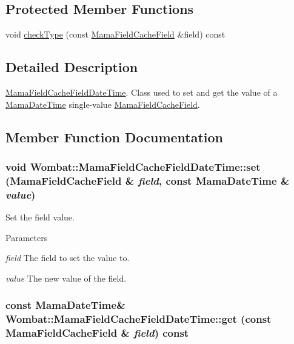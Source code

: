 \subsection*{Protected Member Functions}
\begin{DoxyCompactItemize}
\item 
void \hyperlink{classWombat_1_1MamaFieldCacheFieldDateTime_aee09574007906cf57ffed278b4effe1f}{checkType} (const \hyperlink{classWombat_1_1MamaFieldCacheField}{MamaFieldCacheField} \&field) const 
\end{DoxyCompactItemize}


\subsection{Detailed Description}
\hyperlink{classWombat_1_1MamaFieldCacheFieldDateTime}{MamaFieldCacheFieldDateTime}. Class used to set and get the value of a \hyperlink{classWombat_1_1MamaDateTime}{MamaDateTime} single-\/value {\ttfamily \hyperlink{classWombat_1_1MamaFieldCacheField}{MamaFieldCacheField}}. 

\subsection{Member Function Documentation}
\hypertarget{classWombat_1_1MamaFieldCacheFieldDateTime_a14293e67872bbbb17d43cef3c3380979}{
\subsubsection[{set}]{\setlength{\rightskip}{0pt plus 5cm}void Wombat::MamaFieldCacheFieldDateTime::set ({\bf MamaFieldCacheField} \& {\em field}, \/  const {\bf MamaDateTime} \& {\em value})}}
\label{classWombat_1_1MamaFieldCacheFieldDateTime_a14293e67872bbbb17d43cef3c3380979}


Set the field value. 
\begin{DoxyParams}{Parameters}
\item[{\em field}]The field to set the value to. \item[{\em value}]The new value of the field. \end{DoxyParams}
\hypertarget{classWombat_1_1MamaFieldCacheFieldDateTime_ae62028711522ac173015740165d8424b}{
\subsubsection[{get}]{\setlength{\rightskip}{0pt plus 5cm}const {\bf MamaDateTime}\& Wombat::MamaFieldCacheFieldDateTime::get (const {\bf MamaFieldCacheField} \& {\em field}) const}}
\label{classWombat_1_1MamaFieldCacheFieldDateTime_ae62028711522ac173015740165d8424b}


